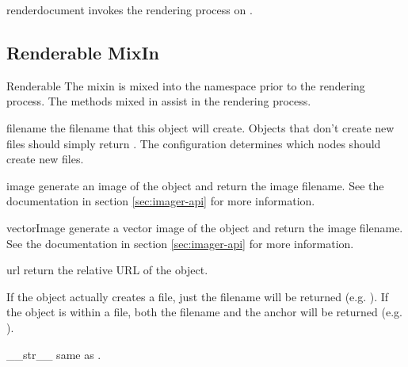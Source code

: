 \begin{methoddesc}[Renderer]{render}{document}
invokes the rendering process on .
\end{methoddesc}


\subsection{Renderable MixIn}

\begin{classdesc}{Renderable}{}
The  mixin is mixed into the  namespace
prior to the rendering process.  The methods mixed in assist in the 
rendering process.
\end{classdesc}

\begin{memberdesc}[Renderable]{filename}
the filename that this object will create.  Objects that don't create 
new files should simply return .   The configuration determines
which nodes should create new files. 
\end{memberdesc}

\begin{memberdesc}[Renderable]{image}
generate an image of the object and return the image filename.  See
the  documentation in section \ref{sec:imager-api} for
more information.
\end{memberdesc}

\begin{memberdesc}[Renderable]{vectorImage}
generate a vector image of the object and return the image filename.  See
the  documentation in section \ref{sec:imager-api} for
more information.
\end{memberdesc}

\begin{memberdesc}[Renderable]{url}
return the relative URL of the object.  

If the object actually creates a file, just the filename will
be returned (e.g. ).  If the object is within a file, 
both the filename and the anchor will be returned 
(e.g. ).
\end{memberdesc}


\begin{methoddesc}[Renderable]{__str__}{}
same as .
\end{methoddesc}

